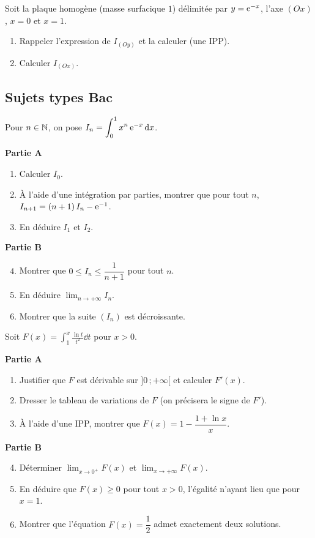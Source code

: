 Soit la plaque homogène (masse surfacique $1$) délimitée par $y=\mathrm{e}^{-x}$,
l'axe $(Ox)$, $x=0$ et $x=1$.
\begin{enumerate}
	\item Rappeler l'expression de $I_{(Oy)}$ et la calculer (une IPP).
	\item Calculer $I_{(Ox)}$.
\end{enumerate}

\subsection{Sujets types Bac}

Pour $n\in\mathbb{N}$, on pose $I_n=\displaystyle\int_0^{1}x^{n}\,\mathrm{e}^{-x}\,\mathrm{d} x$.

\textbf{Partie A}
\begin{enumerate}
	\item Calculer $I_0$.
	\item À l'aide d'une intégration par parties, montrer que pour tout $n$,
	$I_{n+1}=(n+1)\,I_n-\mathrm{e}^{-1}$.
	\item En déduire $I_1$ et $I_2$.
\end{enumerate}

\textbf{Partie B}
\begin{enumerate}
	\setcounter{enumi}{3}
	\item Montrer que $0\leq I_n\leq\dfrac{1}{n+1}$ pour tout $n$.
	\item En déduire $\displaystyle\lim_{n\to+\infty}I_n$.
	\item Montrer que la suite $(I_n)$ est décroissante.
\end{enumerate}

Soit $F(x)=\displaystyle\int_1^{x}\frac{\ln t}{t^{2}}\dd t$ pour $x>0$.

\textbf{Partie A}
\begin{enumerate}
	\item Justifier que $F$ est dérivable sur $]0\,;+\infty[$ et calculer
	$F'(x)$.
	\item Dresser le tableau de variations de $F$ (on précisera le signe de
	$F'$).
	\item À l'aide d'une IPP, montrer que
	$F(x)=1-\dfrac{1+\ln x}{x}$.
\end{enumerate}

\textbf{Partie B}
\begin{enumerate}
	\setcounter{enumi}{3}
	\item Déterminer $\displaystyle\lim_{x\to 0^{+}}F(x)$ et
	$\displaystyle\lim_{x\to+\infty}F(x)$.
	\item En déduire que $F(x)\geq 0$ pour tout $x>0$, l'égalité n'ayant lieu
	que pour $x=1$.
	\item Montrer que l'équation $F(x)=\dfrac{1}{2}$ admet exactement deux
	solutions.
\end{enumerate}


